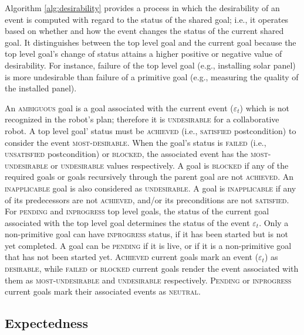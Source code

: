 Algorithm \ref{alg:desirability} provides a process in which the desirability of
an event is computed with regard to the status of the shared goal; i.e., it
operates based on whether and how the event changes the status of the current
shared goal. It distinguishes between the top level goal and the current goal
because the top level goal's change of status attains a higher positive or
negative value of desirability. For instance, failure of the top level goal
(e.g., installing solar panel) is more undesirable than failure of a primitive
goal (e.g., measuring the quality of the installed panel).

An \textsc{ambiguous} goal is a goal associated with the current event
($\varepsilon_t$) which is not recognized in the robot's plan; therefore it is
\textsc{undesirable} for a collaborative robot. A top level goal' status must be
\textsc{achieved} (i.e., \textsc{satisfied} postcondition) to consider the event
\textsc{most-desirable}. When the goal's status is \textsc{failed} (i.e.,
\textsc{unsatisfied} postcondition) or \textsc{blocked}, the associated event
has the \textsc{most-undesirable} or \textsc{undesirable} values respectively.
A goal is \textsc{blocked} if any of the required goals or goals recursively
through the parent goal are not \textsc{achieved}. An \textsc{inapplicable} goal
is also considered as \textsc{undesirable}. A goal is \textsc{inapplicable} if
any of its predecessors are not \textsc{achieved}, and/or its preconditions are
not \textsc{satisfied}. For \textsc{pending} and \textsc{inprogress} top level
goals, the status of the current goal associated with the top level goal
determines the status of the event $\varepsilon_t$. Only a non-primitive goal
can have \textsc{inprogress} status, if it has been started but is not yet
completed. A goal can be \textsc{pending} if it is live, or if it is a
non-primitive goal that has not been started yet. \textsc{Achieved} current
goals mark an event ($\varepsilon_t$) as \textsc{desirable}, while
\textsc{failed} or \textsc{blocked} current goals render the event associated
with them as \textsc{most-undesirable} and \textsc{undesirable} respectively.
\textsc{Pending} or \textsc{inprogress} current goals mark their associated
events as \textsc{neutral}.

\vspace*{-2mm}
\subsection{Expectedness}

